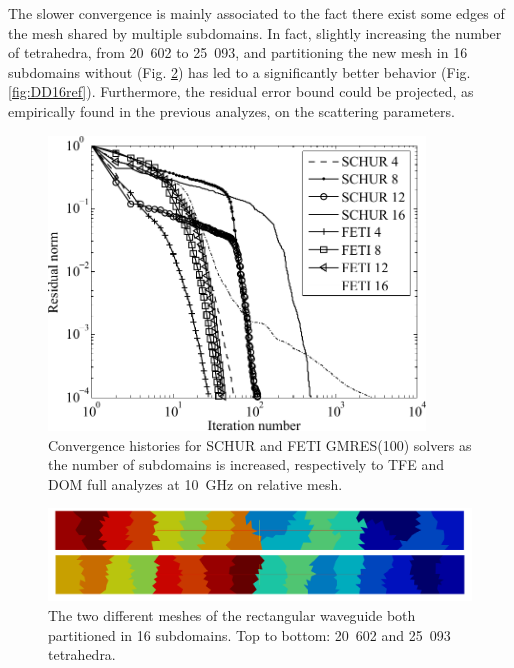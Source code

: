 The slower convergence is mainly associated to the fact there exist some edges of the mesh shared by multiple subdomains. In fact, slightly increasing the number of tetrahedra, from 20~602 to 25~093, and partitioning the new mesh in 16 subdomains without  (Fig. \ref{fig:Partitions2}) has led to a significantly better behavior (Fig. \ref{fig:DD16ref}). Furthermore, the residual error bound could be projected, as empirically found in the previous analyzes, on the scattering parameters.

\begin{figure}[h!]
\centering
\includegraphics[width=10cm]{DDsweep}
\caption{Convergence histories for SCHUR and FETI GMRES(100) solvers as the number of subdomains is increased, respectively to TFE and DOM full analyzes at 10~GHz on relative mesh.}
\label{fig:DDsweep}
\end{figure}

\begin{figure}[h!]
\centering
\includegraphics[width=13.4cm]{Partitions2}
\caption{The two different meshes of the rectangular waveguide both partitioned in 16 subdomains. Top to bottom: 20~602 and 25~093 tetrahedra.}
\label{fig:Partitions2}
\end{figure}

